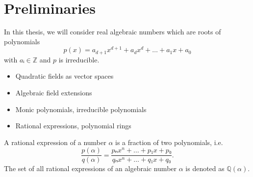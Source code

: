 \chapter{Preliminaries}

In this thesis, we will consider real algebraic numbers which are roots of polynomials
\[
  p(x) = a_{d+1} x^{d+1} + a_d x^d + \dots + a_1 x + a_0
\]
with $aᵢ ∈ ℤ$ and $p$ is irreducible.

\begin{itemize}
  \item Quadratic fields as vector spaces
  \item Algebraic field extensions
  \item Monic polynomials, irreducible polynomials
  \item Rational expressions, polynomial rings
\end{itemize}

A rational expression of a number $α$ is a fraction of two polynomials, i.e.
\[
  \frac{p(α)}{q(α)} = \frac{pₙ x^n + \dots + p₁ x + p₀}{qₙ x^n + \dots + q₁ x + q₀}.
\]
The set of all rational expressions of an algebraic number $α$ is denoted as $ℚ(α)$.
